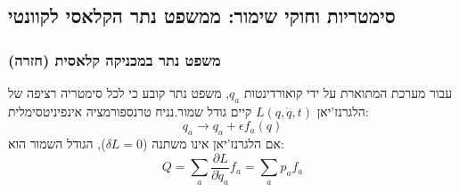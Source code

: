 \subsection{סימטריות וחוקי שימור: ממשפט נתר הקלאסי לקוונטי}
\subsubsection{משפט נתר במכניקה קלאסית (חזרה)}
עבור מערכת המתוארת על ידי קואורדינטות $q_{a}$, משפט נתר קובע כי לכל סימטריה
רציפה של הלגרנז'יאן $L(q, \dot{q}, t)$ קיים גודל שמור.נניח טרנספורמציה
אינפיניטסימלית:
\begin{equation}
    q_{a} \rightarrow q_{a} + \epsilon f_{a}(q)
\end{equation}אם הלגרנז'יאן אינו משתנה ($\delta L = 0$), הגודל השמור הוא:
\begin{equation}
    Q = \sum_{a} \frac{\partial L}{\partial \dot{q}_{a}}f_{a} = \sum_{a} p_{a} f_{a}
\end{equation}
